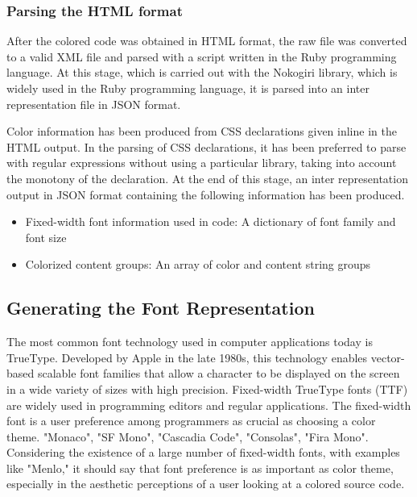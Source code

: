 \documentclass{article}
\begin{document}
\subsubsection{Parsing the HTML format}

After the colored code was obtained in HTML format, the raw file was converted to a valid XML file and parsed with a script written in the Ruby programming language. At this stage, which is carried out with the Nokogiri library\cite{nokogiri2022package}, which is widely used in the Ruby programming language, it is parsed into an inter representation file in JSON format.

Color information has been produced from CSS declarations given inline in the HTML output. In the parsing of CSS declarations, it has been preferred to parse with regular expressions without using a particular library, taking into account the monotony of the declaration. At the end of this stage, an inter representation output in JSON format containing the following information has been produced.

\begin{itemize}
  \item Fixed-width font information used in code: A dictionary of font family and font size
  \item Colorized content groups: An array of color and content string groups
\end{itemize}

\subsection{Generating the Font Representation}

The most common font technology used in computer applications today is TrueType\cite{ttf2022reference}. Developed by Apple in the late 1980s, this technology enables vector-based scalable font families that allow a character to be displayed on the screen in a wide variety of sizes with high precision. Fixed-width TrueType fonts (TTF) are widely used in programming editors and regular applications. The fixed-width font is a user preference among programmers as crucial as choosing a color theme. "Monaco", "SF Mono", "Cascadia Code", "Consolas", "Fira Mono".
Considering the existence of a large number of\cite{wikipedia2022monospace} fixed-width fonts, with examples like "Menlo," it should say that font preference is as important as color theme, especially in the aesthetic perceptions of a user looking at a colored source code\cite{so2010monospace,quora2018monospace}.
\end{document}
